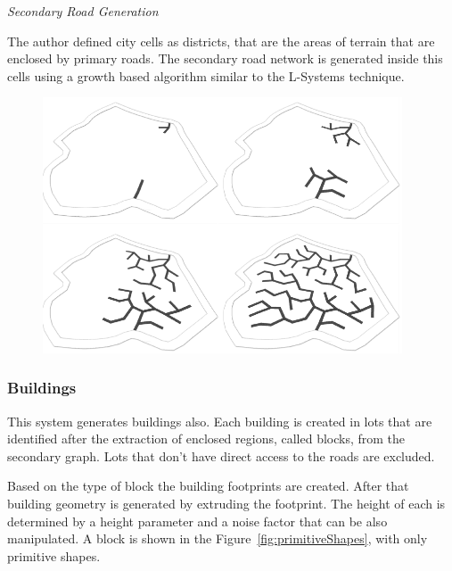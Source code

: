 \emph{Secondary Road Generation}

The author defined city cells as districts, that are the areas of terrain that are enclosed by primary roads. The secondary road network is generated inside this cells using a growth based algorithm similar to the L-Systems technique.

\begin{figure}[htbp]
	\centering
	\includegraphics[width=0.95\textwidth]{img/CityGen/SecondaryRoadGrowth.png}
	\caption{}
	\label{fig:graphs}
\end{figure}



\subsubsection{Buildings} %
\label{ssub:buildings}



This system generates buildings also. Each building is created in lots that are identified after the extraction of enclosed regions, called blocks, from the secondary graph. Lots that don't have direct access to the roads are excluded. 


Based on the type of block the building footprints are created. After that building geometry is generated by extruding the footprint. The height of each is determined by a height parameter and a noise factor that can be also manipulated. A block is shown in the Figure~\ref{fig:primitiveShapes}, with only primitive shapes.

